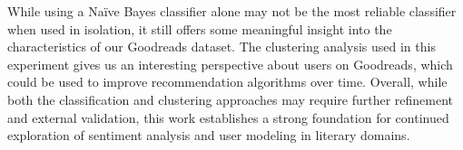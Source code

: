 While using a Na\"ive Bayes classifier alone may not be the most reliable classifier when used in isolation, it still offers some meaningful insight into
the characteristics of our Goodreads dataset. The clustering analysis used in this experiment gives us an interesting perspective about users on Goodreads, which could be used
to improve recommendation algorithms over time.
Overall, while both the classification and clustering approaches may require further refinement and external validation, this work establishes a strong foundation for continued exploration of sentiment analysis and user modeling in literary domains.